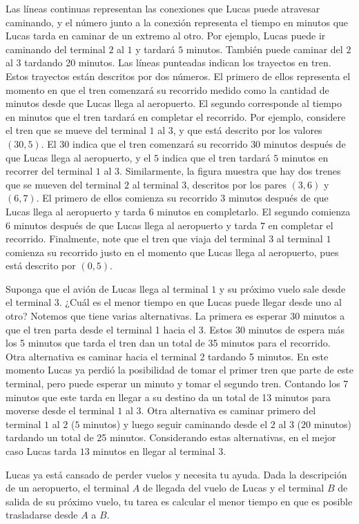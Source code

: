 \documentclass{oci}
\begin{document}
\begin{problemDescription}
  Las líneas continuas representan las conexiones que Lucas puede atravesar
  caminando, y el número junto a la conexión representa el tiempo en minutos que Lucas tarda
  en caminar de un extremo al otro. Por ejemplo, Lucas puede ir caminando del terminal $2$ al $1$
  y tardará $5$ minutos. También puede caminar del $2$ al $3$ tardando 20 minutos.
  Las líneas punteadas indican los trayectos en tren.
  Estos trayectos están descritos por dos números. El primero de ellos
  representa el momento en que el tren comenzará su recorrido 
  medido como la cantidad de minutos desde que Lucas llega al aeropuerto.
  El segundo corresponde al tiempo en minutos que el tren tardará en
  completar el recorrido.
  Por ejemplo, considere el tren que se mueve del terminal $1$ al $3$, y que está
  descrito por los valores $(30, 5)$. El $30$ indica que el tren comenzará su recorrido 
  $30$ minutos después de que Lucas llega al aeropuerto, y el $5$ indica que el tren tardará $5$ minutos
  en recorrer del terminal $1$ al $3$.
  Similarmente, la figura muestra que hay dos trenes que se mueven del terminal $2$ al terminal $3$, descritos por los pares $(3,6)$ y $(6,7)$.
  El primero de ellos comienza su recorrido $3$ minutos después de que Lucas llega al aeropuerto y tarda $6$ minutos en completarlo.
  El segundo comienza $6$ minutos después de que Lucas llega al aeropuerto y tarda $7$ en completar el recorrido.
  Finalmente, note que el tren que viaja del terminal 
  $3$ al terminal $1$ comienza su recorrido justo en el momento
  que Lucas llega al aeropuerto, pues está descrito por $(0,5)$.

  Suponga que el avión de Lucas llega al terminal $1$ y su próximo vuelo sale desde
  el terminal $3$. ¿Cuál es el menor tiempo en que Lucas puede llegar desde uno al otro?
  Notemos que tiene varias
  alternativas.
  La primera es esperar 30 minutos a que el tren parta desde el terminal 1 hacia
  el 3.
  Estos 30 minutos de espera más los 5 minutos que tarda el tren dan un total de
  35 minutos para el recorrido.
  Otra alternativa es caminar hacia el terminal 2 tardando 5 minutos.
  En este momento Lucas ya perdió la posibilidad de tomar el primer tren que
  parte de este terminal, pero puede esperar un minuto y tomar el segundo tren.
  Contando los 7 minutos que este tarda en llegar a su destino da un total de 13
  minutos para moverse desde el terminal $1$ al $3$.
  Otra alternativa es caminar primero del terminal $1$ al $2$ ($5$ minutos) 
  y luego seguir caminando desde el $2$ al $3$ ($20$ minutos) 
  tardando un total de 25 minutos.
  Considerando estas alternativas, en el mejor caso Lucas tarda 
  $13$ minutos en llegar al terminal $3$.

  Lucas ya está cansado de perder vuelos y necesita tu ayuda.
  Dada la descripción de un aeropuerto, el terminal $A$ de llegada del vuelo de Lucas y el terminal $B$
  de salida de su próximo vuelo, tu tarea es calcular el menor tiempo en que es posible
  trasladarse desde $A$ a $B$.
  

\end{problemDescription}
\end{document}

